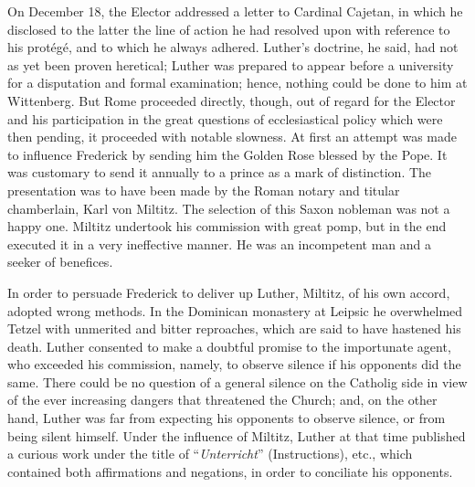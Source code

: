 On December 18, the Elector addressed a letter to Cardinal
Cajetan, in which he disclosed to the latter the line of action he had
resolved upon with reference to his protégé, and to which he
always adhered. Luther’s doctrine, he said, had not as yet been proven
heretical; Luther was prepared to appear before a university for a disputation
and formal examination; hence, nothing could be done to
him at Wittenberg. But Rome proceeded directly, though, out of
regard for the Elector and his participation in the great questions
of ecclesiastical policy which were then pending, it proceeded with
notable slowness. At first an attempt was made to influence Frederick
by sending him the Golden Rose blessed by the Pope. It was customary
to send it annually to a prince as a mark of distinction. The
presentation was to have been made by the Roman notary and titular
chamberlain, Karl von Miltitz. The selection of this Saxon nobleman
was not a happy one. Miltitz undertook his commission with great
pomp, but in the end executed it in a very ineffective manner. He was
an incompetent man and a seeker of benefices.

In order to persuade Frederick to deliver up Luther, Miltitz, of
his own accord, adopted wrong methods. In the Dominican monastery at Leipsic
he overwhelmed Tetzel with unmerited and bitter
reproaches, which are said to have hastened his death. Luther consented
to make a doubtful promise to the importunate agent, who
exceeded his commission, namely, to observe silence if his opponents
did the same. There could be no question of a general silence on the
Catholig side in view of the ever increasing dangers that threatened
the Church; and, on the other hand, Luther was far from expecting
his opponents to observe silence, or from being silent himself. Under
the influence of Miltitz, Luther at that time published a curious work
under the title of “\textit{Unterricht}” (Instructions), etc., which contained
both affirmations and negations, in order to conciliate his opponents.

